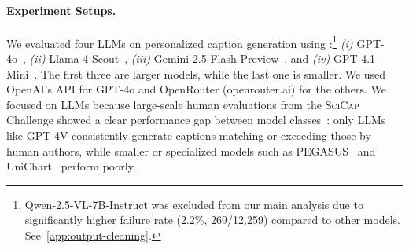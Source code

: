 

\paragraph{Experiment Setups.}\label{para:Experiment-Setups}
We evaluated four LLMs
on personalized caption generation using \dataset:\footnote{Qwen-2.5-VL-7B-Instruct was excluded from our main analysis due to significantly higher failure rate (2.2\%, 269/12,259) compared to other models. See~\autoref{app:output-cleaning}.}
{\em (i)} GPT-4o~\cite{hurst2024gpt}, 
{\em (ii)} Llama 4 Scout~\cite{meta2025llama4}, 
{\em (iii)} Gemini 2.5 Flash Preview~\cite{gemini25flash}, and 
{\em (iv)} GPT-4.1 Mini~\cite{openai2024gpt41mini}.
The first three are larger models, while the last one is smaller.
We used OpenAI's API for GPT-4o and OpenRouter (openrouter.ai) for the others. 
We focused on LLMs because large-scale human evaluations from the \textsc{SciCap} Challenge showed a clear performance gap between model classes~\cite{hsu2025large}: only LLMs like GPT-4V consistently generate captions matching or exceeding those by human authors, while smaller or specialized models such as PEGASUS~\cite{zhang2020pegasus} and UniChart~\cite{masry2023unichart} perform poorly.




